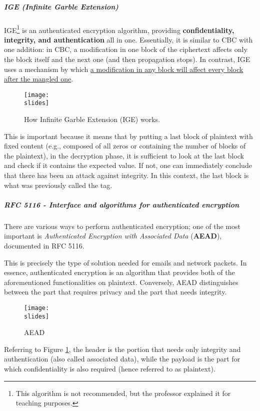\subparagraph{IGE (Infinite Garble Extension)}

IGE\footnote{This algorithm is not recommended, but the professor explained it for teaching purposes.} is an authenticated encryption algorithm, providing \textbf{confidentiality, integrity, and authentication} all in one.
Essentially, it is similar to CBC with one addition: in CBC, a modification in one block of the ciphertext affects only the block itself and the next one (and then propagation stops). In contrast, IGE uses a mechanism by which \ul{a modification in any block will affect every block after the mangled one}.

\begin{figure}[h]
    \centering
    \texttt{[image: \\slides]}
    \caption{How Infinite Garble Extension (IGE) works.}
\end{figure}

This is important because it means that by putting a last block of plaintext with fixed content (e.g., composed of all zeros or containing the number of blocks of the plaintext), in the decryption phase, it is sufficient to look at the last block and check if it contains the expected value. If not, one can immediately conclude that there has been an attack against integrity. In this context, the last block is what was previously called the tag.


\subparagraph{RFC 5116 - Interface and algorithms for authenticated encryption}
There are various ways to perform authenticated encryption; one of the most important is \textit{Authenticated Encryption with Associated Data} (\textbf{AEAD}), documented in RFC 5116.

This is precisely the type of solution needed for emails and network packets. In essence, authenticated encryption is an algorithm that provides both of the aforementioned functionalities on plaintext. Conversely, AEAD distinguishes between the part that requires privacy and the part that needs integrity.
\begin{figure}[h]
    \centering
    \texttt{[image: \\slides]}
    \caption{AEAD}
    \label{fig:AEAD}
\end{figure}

Referring to Figure \ref{fig:AEAD}, the header is the portion that needs only integrity and authentication (also called associated data), while the payload is the part for which confidentiality is also required (hence referred to as plaintext).

